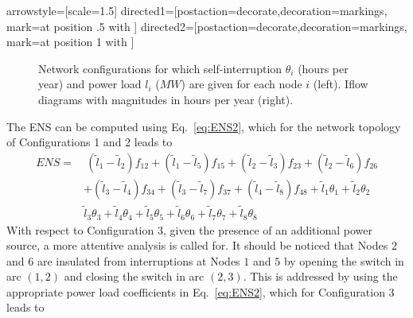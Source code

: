 \tikzstyle arrowstyle=[scale=1.5]
\tikzstyle directed1=[postaction={decorate,decoration={markings,
mark=at position .5 with {}}}]
\tikzstyle directed2=[postaction={decorate,decoration={markings,
mark=at position 1 with {}}}]

\begin{figure}[hbtp]
\begin{center}
\end{center}
\begin{center}
\end{center}
\begin{center}
\end{center}
\caption{Network configurations for which self-interruption $\theta_i$ (hours per year) and power load $l_i$ ($MW$) are given for each node $i$ (left). Iflow diagrams with magnitudes in hours per year (right).}
\label{fig:billintonCaseE1}
\end{figure}

The ENS can be computed using Eq.~\eqref{eq:ENS2}, which for the network topology of Configurations 1 and 2 leads to
\begin{align} 
	\displaystyle ENS =& \ (\tilde{l}_1-\tilde{l}_2)f_{12} + (\tilde{l}_1-\tilde{l}_5)f_{15} + (\tilde{l}_2-\tilde{l}_3)f_{23} + (\tilde{l}_2-\tilde{l}_6)f_{26} \nonumber \\
	&+ (\tilde{l}_3-\tilde{l}_4)f_{34} + (\tilde{l}_3-\tilde{l}_7)f_{37} + (\tilde{l}_4-\tilde{l}_8)f_{48} + 
	\tilde{l}_1\theta_1 + \tilde{l}_2\theta_2 \nonumber \\
	&\tilde{l}_3\theta_3 + \tilde{l}_4\theta_4 + \tilde{l}_5\theta_5 + \tilde{l}_6\theta_6
	+ \tilde{l}_7\theta_7 + \tilde{l}_8\theta_8 
	\label{eq:example}
\end{align}	
With respect to Configuration 3, given the presence of an additional power source, a more attentive analysis is called for. 
It should be noticed that Nodes $2$ and $6$ are insulated from interruptions at Nodes $1$ and $5$ by opening the switch in arc $(1,2)$ and closing the switch in arc $(2,3)$. This is addressed by using the appropriate power load coefficients in Eq.~\eqref{eq:ENS2}, which for Configuration 3 leads to


